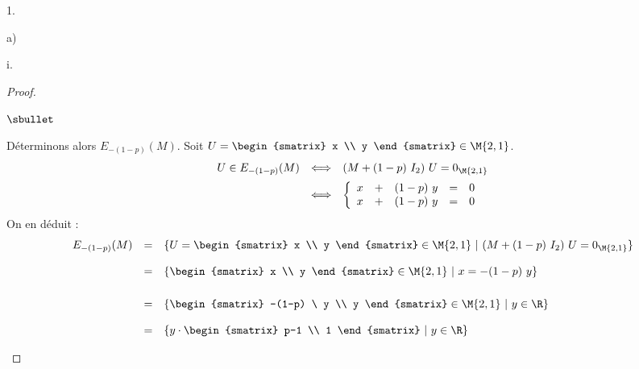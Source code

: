 \begin{noliste}{1.}
\begin{noliste}{a)}
\begin{nonoliste}{i.}
\begin{proof}
\begin{noliste}{$\sbullet$}
        \item Déterminons alors $E_{-(1-p)}(M)$. Soit $U =
          \begin{smatrix}
            x \\
            y 
          \end{smatrix}
          \in \M{2,1}
          $.
          \[
          \begin{array}{rcl}
            U \in E_{-(1-p)}(M) & \Longleftrightarrow & (M + (1-p) \ I_2) \ U
            = 0_{\M{2,1}} 
            \\[.2cm]
            & \Longleftrightarrow & 
            \left\{
              \begin{array}{rcrcc}
                x & + & (1-p) \ y & = & 0 \\
                x & + & (1-p) \ y & = & 0 
              \end{array}
            \right. %
          \end{array}
          \]
          On en déduit :
          \[
          \begin{array}{rcl}
            E_{-(1-p)}(M) & = & \{U =
            \begin{smatrix}
              x \\
              y 
            \end{smatrix}
            \in \M{2,1}
            \ | \ 
            (M + (1-p) \ I_2) \ U = 0_{\M{2,1}}
            \}
            \\[.4cm]
            & = & \{
            \begin{smatrix}
              x \\
              y 
            \end{smatrix}
            \in \M{2,1}        
            \ | \ 
            x = -(1-p) \ y
            \}
            \\[.6cm]
            & = & \{
            \begin{smatrix}
              -(1-p) \ y \\
              y 
            \end{smatrix}
            \in \M{2,1}        
            \ | \ 
            y \in \R
            \}
            \\[.4cm]
            & = & \{
            y \cdot
            \begin{smatrix}
              p-1 \\
              1 
            \end{smatrix}
            \ | \ 
            y \in \R
            \}

\end{array}\]
\end{noliste}
\end{proof}
\end{nonoliste}
\end{noliste}
\end{noliste}
